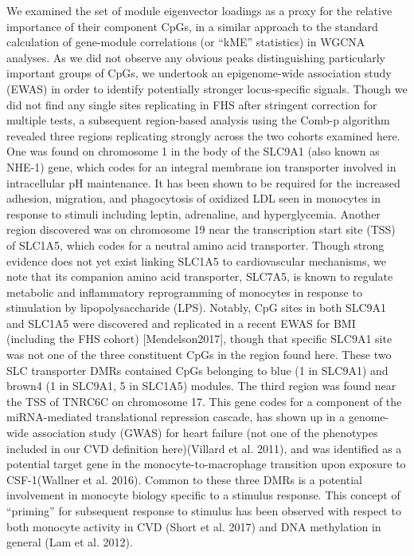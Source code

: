 \documentclass[]{article}
\theoremstyle{definition}
\theoremstyle{definition}
\theoremstyle{definition}
\theoremstyle{remark}
\begin{document}
We examined the set of module eigenvector loadings as a proxy for the
relative importance of their component CpGs, in a similar approach to
the standard calculation of gene-module correlations (or ``kME''
statistics) in WGCNA analyses. As we did not observe any obvious peaks
distinguishing particularly important groups of CpGs, we undertook an
epigenome-wide association study (EWAS) in order to identify potentially
stronger locus-specific signals. Though we did not find any single sites
replicating in FHS after stringent correction for multiple tests, a
subsequent region-based analysis using the Comb-p algorithm revealed
three regions replicating strongly across the two cohorts examined here.
One was found on chromosome 1 in the body of the SLC9A1 (also known as
NHE-1) gene, which codes for an integral membrane ion transporter
involved in intracellular pH maintenance. It has been shown to be
required for the increased adhesion, migration, and phagocytosis of
oxidized LDL seen in monocytes in response to stimuli including leptin,
adrenaline, and hyperglycemia. Another region discovered was on
chromosome 19 near the transcription start site (TSS) of SLC1A5, which
codes for a neutral amino acid transporter. Though strong evidence does
not yet exist linking SLC1A5 to cardiovascular mechanisms, we note that
its companion amino acid transporter, SLC7A5, is known to regulate
metabolic and inflammatory reprogramming of monocytes in response to
stimulation by lipopolysaccharide (LPS). Notably, CpG sites in both
SLC9A1 and SLC1A5 were discovered and replicated in a recent EWAS for
BMI (including the FHS cohort) {[}Mendelson2017{]}, though that specific
SLC9A1 site was not one of the three constituent CpGs in the region
found here. These two SLC transporter DMRs contained CpGs belonging to
blue (1 in SLC9A1) and brown4 (1 in SLC9A1, 5 in SLC1A5) modules. The
third region was found near the TSS of TNRC6C on chromosome 17. This
gene codes for a component of the miRNA-mediated translational
repression cascade, has shown up in a genome-wide association study
(GWAS) for heart failure (not one of the phenotypes included in our CVD
definition here)(Villard et al. 2011), and was identified as a potential
target gene in the monocyte-to-macrophage transition upon exposure to
CSF-1(Wallner et al. 2016). Common to these three DMRs is a potential
involvement in monocyte biology specific to a stimulus response. This
concept of ``priming'' for subsequent response to stimulus has been
observed with respect to both monocyte activity in CVD (Short et al.
2017) and DNA methylation in general (Lam et al. 2012).
\end{document}
